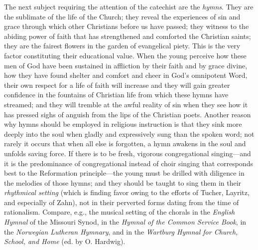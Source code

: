 The next subject requiring the attention of the catechist are the \emph{hymns}. They are the sublimate of the life of the Church; they reveal the experiences of sin and grace through which other Christians before us have passed; they witness to the abiding power of faith that has strengthened and comforted the Christian saints; they are the fairest flowers in the garden of evangelical piety. This is the very factor constituting their educational value. When the young perceive how these men of God have been sustained in affliction by their faith and by grace divine, how they have found shelter and comfort and cheer in God's omnipotent Word, their own respect for a life of faith will increase and they
will gain greater confidence in the fountains of Christian life from which these hymns have streamed; and they will tremble at the awful reality of sin when they see how it has pressed sighs of anguish from the lips of the Christian poets. Another reason why hymns should be employed in religious instruction is that they sink more deeply into the soul when gladly and expressively sung than the spoken word; not rarely it occurs that when all else is forgotten, a hymn awakens in the soul and unfolds saving force. If there is to be fresh, vigorous congregational singing—and it is the predominance of congregational instead of choir singing that corresponds best to the Reformation principle—the young must be drilled with diligence in the melodies of those hymns; and they should be taught to sing them in their \emph{rhythmical setting} (which is finding favor owing to the efforts of Tucher, Layritz, and especially of Zahn), not in their perverted forms dating from the time of rationalism. Compare, e.g., the musical setting of the chorals in the \emph{English Hymnal} of the Missouri Synod, in the \emph{Hymnal of the Common Service Book}, in the \emph{Norwegian Lutheran Hymnary}, and in the \emph{Wartburg Hymnal for Church, School, and Home} (ed. by O. Hardwig).

